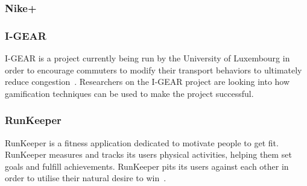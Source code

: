\documentclass[a4paper,12pt]{article}
\begin{document}
\subsubsection{Nike+}


\subsubsection{I-GEAR}
I-GEAR is a project currently being run by the University of Luxembourg in order to encourage commuters to modify their transport behaviors to ultimately reduce congestion~\citep{igear,igear-2}. 
Researchers on the I-GEAR project are looking into how gamification techniques can be used to make the project successful.

\subsubsection{RunKeeper}
RunKeeper is a fitness application dedicated to motivate people to get fit. 
RunKeeper measures and tracks its users physical activities, helping them set goals and fulfill achievements. 
RunKeeper pits its users against each other in order to utilise their natural desire to win~\citep{desire-to-win}.
\end{document}
